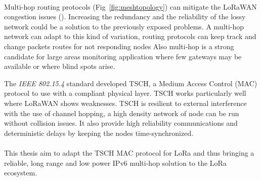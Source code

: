 


\paragraph{}

Multi-hop routing protocols (Fig~\ref{fig:meshtopology}) can mitigate
the LoRaWAN congestion issues (\cite{8115756}).
Increasing the redundancy and the reliability of the lossy network could be a
solution to the previously exposed problems.
A multi-hop network can adapt to this kind of variation, routing protocols can
keep track and change packets routes for not responding nodes
Also multi-hop is a strong candidate for large areas monitoring application
where few gateways may be available or where blind spots arise.

The \emph{IEEE 802.15.4} standard developed TSCH, a Medium Access Control (MAC)
protocol to use with a compliant physical layer.
TSCH works particularly well where LoRaWAN shows weaknesses. 
TSCH is resilient to external interference with the use of channel hopping, a
high density network of node can be run without collision issues.
It also provide high reliability communications and deterministic delays by 
keeping the nodes time-synchronized.

\paragraph{}

This thesis aim to adapt the TSCH MAC protocol for LoRa
and thus bringing a reliable, long range and low power IPv6 multi-hop
solution to the LoRa ecosystem.

